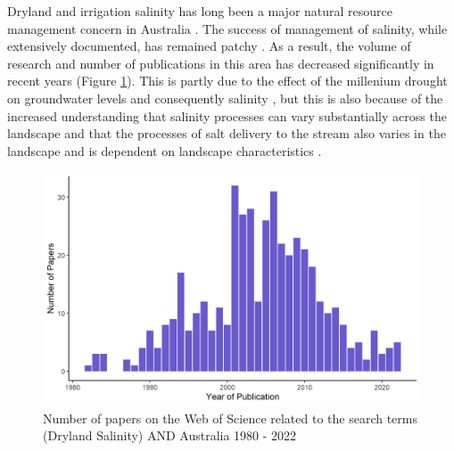\documentclass[, manuscript]{copernicus}
\begin{document}


\introduction

Dryland and irrigation salinity has long been a major natural resource
management concern in Australia
\citep{Jolly2001, White2009, Scanlon2007, Walker2002, Finlayson2010}.
The success of management of salinity, while extensively documented, has
remained patchy \citep{Leblanc2012}. As a result, the volume of research
and number of publications in this area has decreased significantly in
recent years (Figure \ref{fig:SalinityPapers}). This is partly due to
the effect of the millenium drought on groundwater levels and
consequently salinity \citep{Mcfarlane2016}, but this is also because of
the increased understanding that salinity processes can vary
substantially across the landscape \citep{Conyers2008} and that the
processes of salt delivery to the stream also varies in the landscape
\citep{Summerell2006, Hughes2007} and is dependent on landscape
characteristics \citep{vanDijk2008, Dalhaus2010}.

\begin{figure}
\includegraphics[width=0.9\linewidth]{Figures/Dryland Salinity Papers} \caption{Number of papers on the Web of Science related to the search terms (Dryland Salinity) AND Australia 1980 - 2022}\label{fig:SalinityPapers}
\end{figure}
\end{document}
